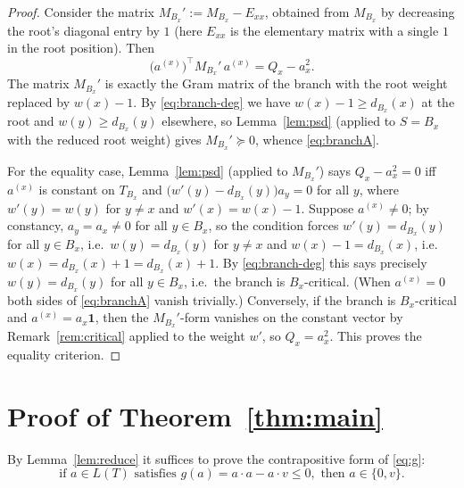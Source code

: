 \documentclass[11pt]{article}
\theoremstyle{definition}
\begin{document}
\begin{proof}
Consider the matrix $M_{B_x}':=M_{B_x}-E_{xx}$, obtained from $M_{B_x}$ by decreasing the
root's diagonal entry by $1$ (here $E_{xx}$ is the elementary matrix with a single $1$
in the root position). Then
\[
\bigl(a^{(x)}\bigr)^\top M_{B_x}'\,a^{(x)}=Q_x-a_x^2 .
\]
The matrix $M_{B_x}'$ is exactly the Gram matrix of the branch with the root weight
replaced by $w(x)-1$. By \eqref{eq:branch-deg} we have $w(x)-1\ge d_{B_x}(x)$ at the
root and $w(y)\ge d_{B_x}(y)$ elsewhere, so Lemma~\ref{lem:psd} (applied to $S=B_x$ with
the reduced root weight) gives $M_{B_x}'\succeq 0$, whence \eqref{eq:branchA}.

For the equality case, Lemma~\ref{lem:psd} (applied to $M_{B_x}'$) says
$Q_x-a_x^2=0$ iff $a^{(x)}$ is constant on $T_{B_x}$ and
$\bigl(w'(y)-d_{B_x}(y)\bigr)a_y=0$ for all $y$, where $w'(y)=w(y)$ for $y\neq x$ and
$w'(x)=w(x)-1$. Suppose $a^{(x)}\neq 0$; by constancy, $a_y=a_x\neq 0$ for all $y\in B_x$,
so the condition forces $w'(y)=d_{B_x}(y)$ for all $y\in B_x$, i.e.\ $w(y)=d_{B_x}(y)$
for $y\neq x$ and $w(x)-1=d_{B_x}(x)$, i.e.\ $w(x)=d_{B_x}(x)+1=d_{B_x}(x)+1$. By
\eqref{eq:branch-deg} this says precisely $w(y)=d_{B_x}(y)$ for all $y\in B_x$, i.e.\
the branch is $B_x$-critical. (When $a^{(x)}=0$ both sides of \eqref{eq:branchA} vanish
trivially.) Conversely, if the branch is $B_x$-critical and $a^{(x)}=a_x\mathbf 1$,
then the $M_{B_x}'$-form vanishes on the constant vector by Remark~\ref{rem:critical}
applied to the weight $w'$, so $Q_x=a_x^2$. This proves the equality criterion.
\end{proof}

\section{Proof of Theorem~\ref{thm:main}}\label{sec:proof}

By Lemma~\ref{lem:reduce} it suffices to prove the contrapositive form of \eqref{eq:g}:
\begin{equation}\label{eq:goal}
\text{if }a\in L(T)\text{ satisfies }g(a)=a\cdot a-a\cdot v\le 0,\text{ then }a\in\{0,v\}.
\end{equation}
\end{document}
